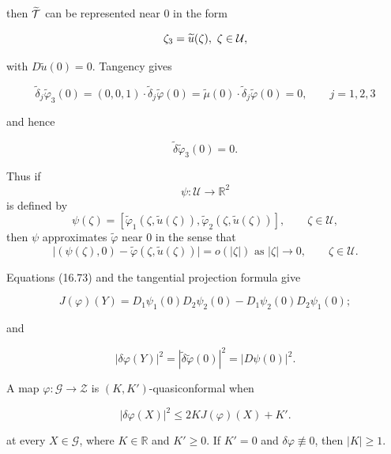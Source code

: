 then $\widetilde{\mathcal{T}}$ can be represented near $0$ in the form

\[
\zeta_3=\widetilde{u}(\zeta),\ \zeta\in\Uc,
\]

with $D\widetilde u(0)=0$.  Tangency gives

\[
\widetilde{\delta}_j\widetilde{\varphi}_3(0)=(0,0,1)\cdot\widetilde{\delta}_j\widetilde{\varphi}(0)
=\widetilde{\mu}(0)\cdot\widetilde{\delta}_j\widetilde{\varphi}(0)=0,\qquad j=1,2,3
\]

and hence

\[
\widetilde{\delta}\widetilde{\varphi}_3(0)=0.
\]



Thus if
\[
\psi : \mathcal U \to \mathbb R^2
\]
is defined by
\[
\psi(\zeta) = [\tilde{\varphi}_1(\zeta,\tilde{u}(\zeta)), \tilde{\varphi}_2(\zeta,\tilde{u}(\zeta))], \qquad \zeta \in \mathcal U,
\]
then $\psi$ approximates $\tilde{\varphi}$ near $0$ in the sense that
\[
\bigl|(\psi(\zeta),0) - \tilde{\varphi}(\zeta,\tilde{u}(\zeta))\bigr| = o(|\zeta|) \text{ as } |\zeta| \to 0, \qquad \zeta \in \mathcal U.
\]

Equations (16.73) and the tangential projection formula give

\begin{equation}
J(\varphi)(Y) = D_1\psi_1(0)D_2\psi_2(0) - D_1\psi_2(0)D_2\psi_1(0);
\tag{16.74}
\end{equation}

and

\begin{equation}
|\delta\varphi(Y)|^2 = |\tilde{\delta}\tilde{\varphi}(0)|^2 = |D\psi(0)|^2.
\tag{16.75}
\end{equation}

A map $\varphi:\mathcal G\to\mathcal Z$ is $(K,K')$-quasiconformal when

\begin{equation}
|\delta\varphi(X)|^2 \leq 2KJ(\varphi)(X) + K'.
\tag{16.76}
\end{equation}

at every $X\in\mathcal G$, where $K\in\mathbb R$ and $K'\ge0$.
If $K'=0$ and $\delta\varphi\not\equiv0$, then $|K|\ge1$.

